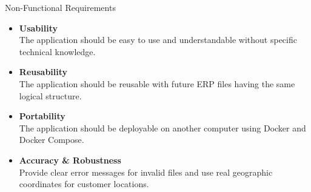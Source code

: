 \begin{frame}{Non-Functional Requirements}
\begin{itemize}
    \item \textbf{Usability}\\
    The application should be easy to use and understandable without specific technical knowledge.
    
    \vspace{0.3cm}
    \item \textbf{Reusability}\\
    The application should be reusable with future ERP files having the same logical structure.
    
    \vspace{0.3cm}
    \item \textbf{Portability}\\
    The application should be deployable on another computer using Docker and Docker Compose.
    
    \vspace{0.3cm}
    \item \textbf{Accuracy \& Robustness}\\
    Provide clear error messages for invalid files and use real geographic coordinates for customer locations.
\end{itemize}
\end{frame}
